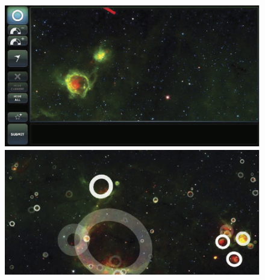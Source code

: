 \documentclass{ar2e}
\begin{document}
\begin{figure}[t]
\begin{minipage}{\linewidth}
  \begin{minipage}{0.45\linewidth}
    \centering\includegraphics[width=\linewidth]{figs/SimpsonEtal2012_interface.png}
  \end{minipage}\hfill
  \begin{minipage}{0.51\linewidth}
    \centering\includegraphics[width=\linewidth]{figs/SimpsonEtal2012_bubbles.png}
  \end{minipage}\hfill
\end{minipage}
\medskip


\end{figure}
\end{document}
